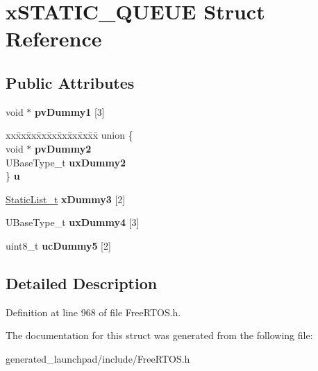 \hypertarget{structxSTATIC__QUEUE}{}\section{x\+S\+T\+A\+T\+I\+C\+\_\+\+Q\+U\+E\+UE Struct Reference}
\label{structxSTATIC__QUEUE}
\subsection*{Public Attributes}
\begin{DoxyCompactItemize}
\item 
\mbox{\label{structxSTATIC__QUEUE_aacf22a66a8d723648995692ec77ee416}} 
void $\ast$ {\bfseries pv\+Dummy1} \mbox{[}3\mbox{]}
\item 
\mbox{\label{structxSTATIC__QUEUE_a8a896145a0d9376a7e2713afdd782c41}} 
\begin{tabbing}
xx\=xx\=xx\=xx\=xx\=xx\=xx\=xx\=xx\=\kill
union \{\\
\>void $\ast$ {\bfseries pvDummy2}\\
\>UBaseType\_t {\bfseries uxDummy2}\\
\} {\bfseries u}\\

\end{tabbing}\item 
\mbox{\label{structxSTATIC__QUEUE_add0de93e08b632124122850bcd543597}} 
\mbox{\hyperlink{structxSTATIC__LIST}{Static\+List\+\_\+t}} {\bfseries x\+Dummy3} \mbox{[}2\mbox{]}
\item 
\mbox{\label{structxSTATIC__QUEUE_a502854697731754ce445f6503d14b127}} 
U\+Base\+Type\+\_\+t {\bfseries ux\+Dummy4} \mbox{[}3\mbox{]}
\item 
\mbox{\label{structxSTATIC__QUEUE_a541c5044376603540cc3c9cabcbdc5e6}} 
uint8\+\_\+t {\bfseries uc\+Dummy5} \mbox{[}2\mbox{]}
\end{DoxyCompactItemize}


\subsection{Detailed Description}


Definition at line 968 of file Free\+R\+T\+O\+S.\+h.



The documentation for this struct was generated from the following file\+:\begin{DoxyCompactItemize}
\item 
generated\+\_\+launchpad/include/Free\+R\+T\+O\+S.\+h\end{DoxyCompactItemize}
